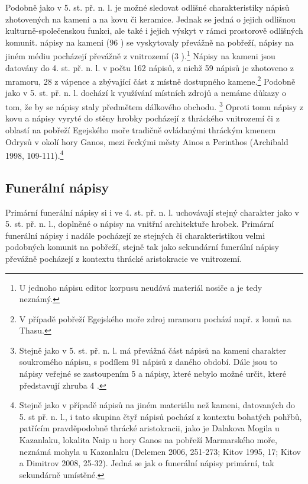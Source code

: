 Podobně jako v 5. st. př. n. l. je možné sledovat odlišné charakteristiky nápisů zhotovených na kameni a na kovu či keramice. Jednak se jedná o jejich odlišnou kulturně-společenskou funkci, ale také i jejich výskyt v rámci prostorově odlišných komunit. nápisy na kameni (96 ) se vyskytovaly převážně na pobřeží, nápisy na jiném médiu pocházejí převážně z vnitrozemí (3 ).\footnote{U jednoho nápisu editor korpusu neudává materiál nosiče a je tedy neznámý.} Nápisy na kameni jsou datovány do 4. st. př. n. l. v počtu 162 nápisů, z nichž 59  nápisů je zhotoveno z mramoru, 28  z vápence a zbývající část z místně dostupného kamene.\footnote{V případě pobřeží Egejského moře zdroj mramoru pochází např. z lomů na Thasu.} Podobně jako v 5. st. př. n. l. dochází k využívání místních zdrojů a nemáme důkazy o tom, že by se nápisy staly předmětem dálkového obchodu. \footnote{Stejně jako v 5. st. př. n. l. má převážná část nápisů na kameni charakter soukromého nápisu, s podílem 91  nápisů z daného období. Dále jsou to nápisy veřejné se zastoupením 5  a nápisy, které nebylo možné určit, které představují zhruba 4 .} Oproti tomu nápisy z kovu a nápisy vyryté do stěny hrobky pocházejí z thráckého vnitrozemí či z oblastí na pobřeží Egejského moře tradičně ovládanými thráckým kmenem Odrysů v okolí hory Ganos, mezi řeckými městy Ainos a Perinthos (Archibald 1998, 109-111).\footnote{Stejně jako v případě nápisů na jiném materiálu než kameni, datovaných do 5. st př. n. l., i tato skupina čtyř nápisů pochází z kontextu bohatých pohřbů, patřícím pravděpodobně thrácké aristokracii, jako je Dalakova Mogila u Kazanlaku, lokalita Naip u hory Ganos na pobřeží Marmarského moře, neznámá mohyla u Kazanlaku (Delemen 2006, 251-273; Kitov 1995, 17; Kitov a Dimitrov 2008, 25-32). Jedná se jak o funerální nápisy primární, tak sekundárně umístěné.}

\subsection[funerální-nápisy-3]{Funerální nápisy}

Primární funerální nápisy si i ve 4. st. př. n. l. uchovávají stejný charakter jako v 5. st. př. n. l., doplněné o nápisy na vnitřní architektuře hrobek. Primární funerální nápisy i nadále pocházejí ze stejných či charakteristikou velmi podobných komunit na pobřeží, stejně tak jako sekundární funerální nápisy převážně pocházejí z kontextu thrácké aristokracie ve vnitrozemí.


